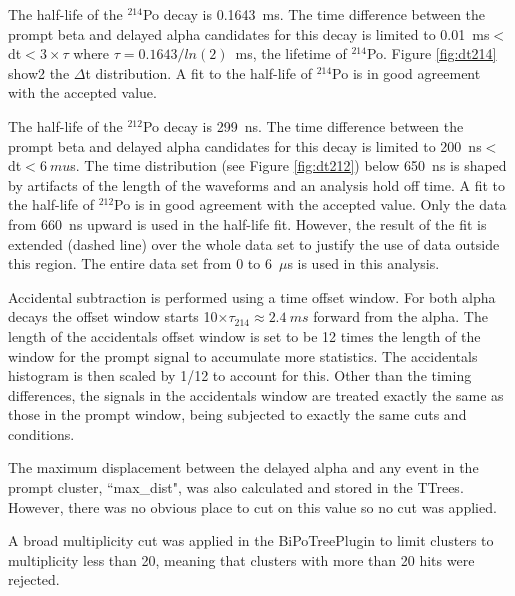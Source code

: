 The half-life of the $^{214}$Po decay is 0.1643~ms. The time difference between the prompt beta and delayed alpha candidates for this decay is limited to 0.01~ms$<$dt$<3\times\tau$ where $\tau=0.1643/ln(2)$~ms, the lifetime of $^{214}$Po. Figure \ref{fig:dt214} show2 the $\Delta$t distribution. A fit to the half-life of $^{214}$Po is in good agreement with the accepted value.

The half-life of the $^{212}$Po decay is 299~ns. The time difference between the prompt beta and delayed alpha candidates for this decay is limited to 200~ns$<$dt$<6~mu$s. The time distribution (see Figure \ref{fig:dt212}) below 650~ns is shaped by artifacts of the length of the waveforms and an analysis hold off time.  A fit to the half-life of $^{212}$Po is in good agreement with the accepted value. Only the data from 660~ns upward is used in the half-life fit. However, the result of the fit is extended (dashed line) over the whole data set to justify the use of data outside this region. The entire data set from 0 to 6~$\mu$s is used in this analysis. 

Accidental subtraction is performed using a time offset window. For both alpha decays the offset window starts 10$\times\tau_{214}\approx2.4~ms$ forward from the alpha. The length of the accidentals offset window is set to be 12 times the length of the window for the prompt signal to accumulate more statistics. The accidentals histogram is then scaled by 1/12 to account for this. Other than the timing differences, the signals in the accidentals window are treated exactly the same as those in the prompt window, being subjected to exactly the same cuts and conditions.

The maximum displacement between the delayed alpha and any event in the prompt cluster, ``max\_dist", was also calculated and stored in the TTrees. However, there was no obvious place to cut on this value so no cut was applied. 

A broad multiplicity cut was applied in the BiPoTreePlugin to limit clusters to multiplicity less than 20, meaning that clusters with more than 20 hits were rejected.

